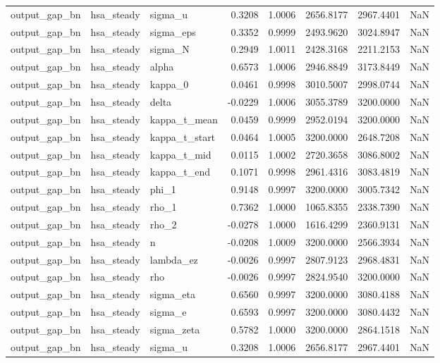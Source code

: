 \begin{tabular}{lllrrrrl}
output\_gap\_bn & hsa\_steady & sigma\_u & 0.3208 & 1.0006 & 2656.8177 & 2967.4401 & NaN \\
output\_gap\_bn & hsa\_steady & sigma\_eps & 0.3352 & 0.9999 & 2493.9620 & 3024.8947 & NaN \\
output\_gap\_bn & hsa\_steady & sigma\_N & 0.2949 & 1.0011 & 2428.3168 & 2211.2153 & NaN \\
output\_gap\_bn & hsa\_steady & alpha & 0.6573 & 1.0006 & 2946.8849 & 3173.8449 & NaN \\
output\_gap\_bn & hsa\_steady & kappa\_0 & 0.0461 & 0.9998 & 3010.5007 & 2998.0744 & NaN \\
output\_gap\_bn & hsa\_steady & delta & -0.0229 & 1.0006 & 3055.3789 & 3200.0000 & NaN \\
output\_gap\_bn & hsa\_steady & kappa\_t\_mean & 0.0459 & 0.9999 & 2952.0194 & 3200.0000 & NaN \\
output\_gap\_bn & hsa\_steady & kappa\_t\_start & 0.0464 & 1.0005 & 3200.0000 & 2648.7208 & NaN \\
output\_gap\_bn & hsa\_steady & kappa\_t\_mid & 0.0115 & 1.0002 & 2720.3658 & 3086.8002 & NaN \\
output\_gap\_bn & hsa\_steady & kappa\_t\_end & 0.1071 & 0.9998 & 2961.4316 & 3083.4819 & NaN \\
output\_gap\_bn & hsa\_steady & phi\_1 & 0.9148 & 0.9997 & 3200.0000 & 3005.7342 & NaN \\
output\_gap\_bn & hsa\_steady & rho\_1 & 0.7362 & 1.0000 & 1065.8355 & 2338.7390 & NaN \\
output\_gap\_bn & hsa\_steady & rho\_2 & -0.0278 & 1.0000 & 1616.4299 & 2360.9131 & NaN \\
output\_gap\_bn & hsa\_steady & n & -0.0208 & 1.0009 & 3200.0000 & 2566.3934 & NaN \\
output\_gap\_bn & hsa\_steady & lambda\_ez & -0.0026 & 0.9997 & 2807.9123 & 2968.4831 & NaN \\
output\_gap\_bn & hsa\_steady & rho & -0.0026 & 0.9997 & 2824.9540 & 3200.0000 & NaN \\
output\_gap\_bn & hsa\_steady & sigma\_eta & 0.6560 & 0.9997 & 3200.0000 & 3080.4188 & NaN \\
output\_gap\_bn & hsa\_steady & sigma\_e & 0.6593 & 0.9997 & 3200.0000 & 3080.4432 & NaN \\
output\_gap\_bn & hsa\_steady & sigma\_zeta & 0.5782 & 1.0000 & 3200.0000 & 2864.1518 & NaN \\
output\_gap\_bn & hsa\_steady & sigma\_u & 0.3208 & 1.0006 & 2656.8177 & 2967.4401 & NaN \\

\end{tabular}
